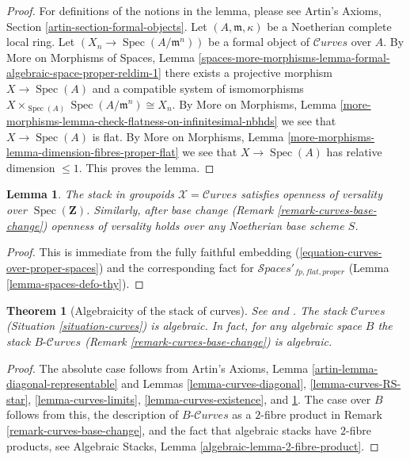 \documentclass{stacks-project}
\newenvironment{reference}{\comment}{\endcomment}
\theoremstyle{plain}
\newtheorem{theorem}[subsection]{Theorem}
\newtheorem{lemma}[subsection]{Lemma}
\theoremstyle{definition}
\theoremstyle{remark}
\numberwithin{equation}{subsection}
\def\Spec{\mathop{\mathrm{Spec}}}
\def\Spacesstack{\mathcal{S}\!\mathit{paces}}
\def\Curvesstack{\mathcal{C}\!\mathit{urves}}
\begin{document}
\begin{proof}
For definitions of the notions in the lemma, please see
Artin's Axioms, Section \ref{artin-section-formal-objects}.
Let $(A, \mathfrak m, \kappa)$ be a Noetherian complete
local ring. Let $(X_n \to \Spec(A/\mathfrak m^n))$
be a formal object of $\Curvesstack$ over $A$.
By More on Morphisms of Spaces, Lemma
\ref{spaces-more-morphisms-lemma-formal-algebraic-space-proper-reldim-1}
there exists a projective morphism $X \to \Spec(A)$
and a compatible system of ismomorphisms
$X \times_{\Spec(A)} \Spec(A/\mathfrak m^n) \cong X_n$. By
More on Morphisms, Lemma
\ref{more-morphisms-lemma-check-flatness-on-infinitesimal-nbhds}
we see that $X \to \Spec(A)$ is flat. By More on Morphisms, Lemma
\ref{more-morphisms-lemma-dimension-fibres-proper-flat}
we see that $X \to \Spec(A)$ has relative dimension $\leq 1$.
This proves the lemma.
\end{proof}

\begin{lemma}
\label{lemma-curves-defo-thy}
The stack in groupoids $\mathcal{X} = \Curvesstack$
satisfies openness of versality over $\Spec(\mathbf{Z})$.
Similarly, after base change (Remark \ref{remark-curves-base-change})
openness of versality holds over any Noetherian base scheme $S$.
\end{lemma}

\begin{proof}
This is immediate from the fully faithful embedding
(\ref{equation-curves-over-proper-spaces}) and
the corresponding fact for $\Spacesstack'_{fp, flat, proper}$
(Lemma \ref{lemma-spaces-defo-thy}).
\end{proof}

\begin{theorem}[Algebraicity of the stack of curves]
\label{theorem-curves-algebraic}
\begin{reference}
See \cite[Proposition 3.3, page 8]{dJHS} and
\cite[Appendix B by Jack Hall, Theorem B.1]{Smyth}.
\end{reference}
The stack $\Curvesstack$ (Situation \ref{situation-curves})
is algebraic. In fact, for any algebraic space $B$ the stack
$B\text{-}\Curvesstack$ (Remark \ref{remark-curves-base-change})
is algebraic.
\end{theorem}

\begin{proof}
The absolute case follows from
Artin's Axioms, Lemma \ref{artin-lemma-diagonal-representable}
and Lemmas \ref{lemma-curves-diagonal},
\ref{lemma-curves-RS-star},
\ref{lemma-curves-limits},
\ref{lemma-curves-existence}, and
\ref{lemma-curves-defo-thy}.
The case over $B$ follows from this, the description of
$B\text{-}\Curvesstack$ as a $2$-fibre product in
Remark \ref{remark-curves-base-change}, and the fact
that algebraic stacks have $2$-fibre products, see
Algebraic Stacks, Lemma \ref{algebraic-lemma-2-fibre-product}.
\end{proof}
\end{document}
